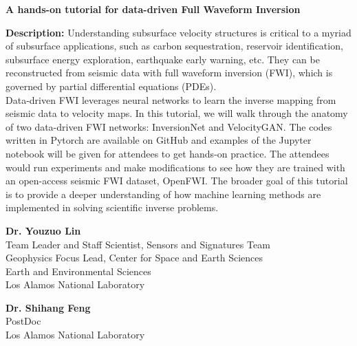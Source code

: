 \bigskip
{\bf A hands-on tutorial for data-driven Full Waveform Inversion}

\bigskip
{\bf Description:} Understanding subsurface velocity structures is critical to a myriad of subsurface applications, such as carbon sequestration, reservoir identification, subsurface energy exploration, earthquake early warning, etc. They can be reconstructed from seismic data with full waveform inversion (FWI), which is governed by partial differential equations (PDEs).\\
Data-driven FWI leverages neural networks to learn the inverse mapping from seismic data to velocity maps. In this tutorial, we will walk through the anatomy of two data-driven FWI networks: InversionNet and VelocityGAN. The codes written in Pytorch are available on GitHub and examples of the Jupyter notebook will be given for attendees to get hands-on practice. The attendees would run experiments and make modifications to see how they are trained with an open-access seismic FWI dataset, OpenFWI. The broader goal of this tutorial is to provide a deeper understanding of how machine learning methods are implemented in solving scientific inverse problems.\bigskip

{\bf Dr. Youzuo Lin}\\
Team Leader and Staff Scientist, Sensors and Signatures Team\\
Geophysics Focus Lead, Center for Space and Earth Sciences\\
Earth and Environmental Sciences\\
Los Alamos National Laboratory\bigskip

{\bf Dr. Shihang Feng}\\
PostDoc\\
Los Alamos National Laboratory
